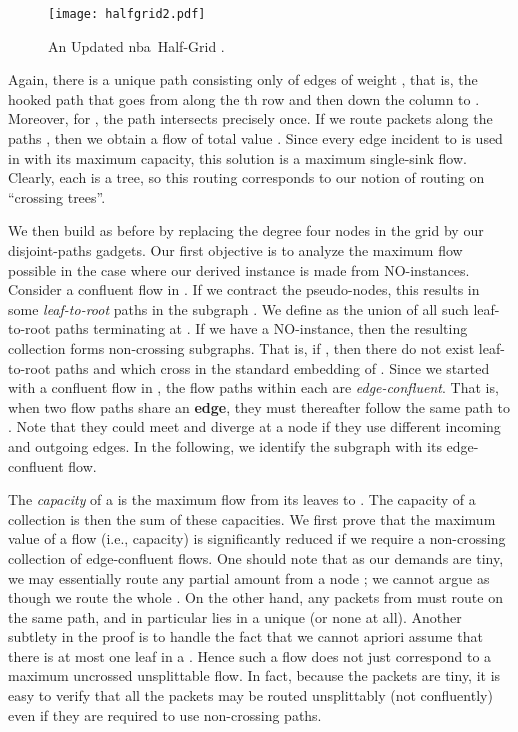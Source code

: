 \documentclass[12pt]{article}
\newcommand{\nba}{{\sc nba}}
\begin{document}
\begin{figure}[h]
\begin{center}
\texttt{[image: halfgrid2.pdf]}
\caption{\label{fig.grid2} An Updated \nba \ Half-Grid .}
\end{center}
\end{figure}

Again, there is a unique  path  consisting only of edges of
weight , that is, the hooked path that goes from  along the
th row and then down the  column to .
Moreover, for , the path  intersects  precisely once.
If we route packets along the paths
, then we obtain a  flow of total value .  Since every edge incident to  is used in
 with its maximum capacity, this solution is a maximum single-sink flow.
Clearly, each  is a tree, so this routing corresponds to our notion of routing on ``crossing trees''.

We then build  as before by replacing the degree four nodes in the grid by our
disjoint-paths gadgets. Our first objective is to analyze the maximum flow possible in the case
where our derived instance  is made from NO-instances. Consider a confluent flow in .
If we contract the pseudo-nodes, this results in some {\em leaf-to-root} paths in the subgraph .
We define  as the union of all such leaf-to-root paths terminating at .
If we have a NO-instance, then  the resulting collection   forms non-crossing subgraphs.
That is, if , then there do not exist leaf-to-root paths  and 
which cross in the standard embedding of .
Since we started with a confluent flow in , the flow paths within each  are {\em edge-confluent}.
That is, when two flow paths share an {\bf edge}, they must thereafter follow the same path to .
Note that they could meet and diverge at a node if they
use different incoming and outgoing edges.
In the following,
we identify the subgraph  with its edge-confluent flow.


The {\em capacity} of a  is the maximum flow from its leaves
to . The capacity of a collection  is then the sum of these capacities.
We first prove that the maximum value of a flow (i.e., capacity) is significantly reduced if we require a
non-crossing collection of edge-confluent flows.
One should note that as our demands are tiny, we may essentially route any partial
amount  from a node ;
we cannot argue as though we route the whole . On the other hand, any
packets from  must route on the same path, and in particular  lies in a unique   (or none at all).
Another subtlety in the proof is to handle the fact that we cannot apriori assume
that there is at most one leaf  in a .
 Hence such a flow does not just correspond to a maximum uncrossed unsplittable flow. In fact, because the packets are tiny,
 it is easy to verify that all the packets may  be routed unsplittably (not confluently) even if they are required to use non-crossing paths.
\end{document}
